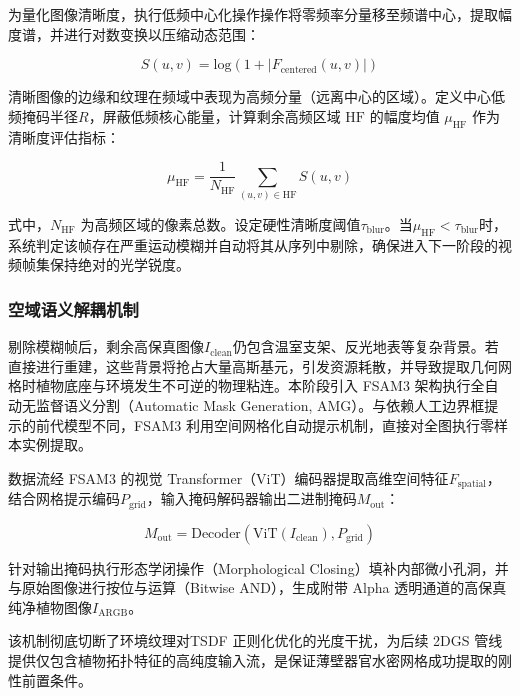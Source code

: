 \documentclass[preprint,12pt]{elsarticle}
\begin{document}
为量化图像清晰度，执行低频中心化操作操作将零频率分量移至频谱中心，提取幅度谱，并进行对数变换以压缩动态范围：

\begin{equation}
S\left(u,v\right)=\mathrm{log}\left(1+\left|{F}_{\mathrm{centered}}\left(u,v\right)\right|\right)
\end{equation}

清晰图像的边缘和纹理在频域中表现为高频分量（远离中心的区域）。定义中心低频掩码半径$R$，屏蔽低频核心能量，计算剩余高频区域 $\mathrm{HF}$ 的幅度均值 ${\mu}_{\mathrm{HF}}$ 作为清晰度评估指标：

\begin{equation}
{\mu}_{\mathrm{HF}}=\frac{1}{{N}_{\mathrm{HF}}}\sum_{\left(u,v\right)\in\mathrm{HF}} S\left(u,v\right)
\end{equation}

式中，${N}_{\mathrm{HF}}$ 为高频区域的像素总数。设定硬性清晰度阈值${\tau}_{\mathrm{blur}}$。当${\mu}_{\mathrm{HF}}<{\tau}_{\mathrm{blur}}$时，系统判定该帧存在严重运动模糊并自动将其从序列中剔除，确保进入下一阶段的视频帧集保持绝对的光学锐度。

\subsubsection{空域语义解耦机制}

剔除模糊帧后，剩余高保真图像${I}_{\mathrm{clean}}$仍包含温室支架、反光地表等复杂背景。若直接进行重建，这些背景将抢占大量高斯基元，引发资源耗散，并导致提取几何网格时植物底座与环境发生不可逆的物理粘连。本阶段引入 FSAM3 架构执行全自动无监督语义分割（Automatic Mask Generation, AMG）。与依赖人工边界框提示的前代模型不同，FSAM3 利用空间网格化自动提示机制，直接对全图执行零样本实例提取。

数据流经 FSAM3 的视觉 Transformer（ViT）编码器提取高维空间特征${F}_{\mathrm{spatial}}$，结合网格提示编码${P}_{\mathrm{grid}}$，输入掩码解码器输出二进制掩码${M}_{\mathrm{out}}$：

\begin{equation}
{M}_{\mathrm{out}}=\mathrm{Decoder}\left(\mathrm{ViT}\left({I}_{\mathrm{clean}}\right),{P}_{\mathrm{grid}}\right)
\end{equation}

针对输出掩码执行形态学闭操作（Morphological Closing）填补内部微小孔洞，并与原始图像进行按位与运算（Bitwise AND），生成附带 Alpha 透明通道的高保真纯净植物图像${I}_{\mathrm{ARGB}}$。

该机制彻底切断了环境纹理对TSDF 正则化优化的光度干扰，为后续 2DGS 管线提供仅包含植物拓扑特征的高纯度输入流，是保证薄壁器官水密网格成功提取的刚性前置条件。
\end{document}

